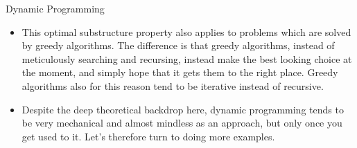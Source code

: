 \documentclass{beamer}
\begin{document}
\begin{frame}{Dynamic Programming}
    \begin{itemize}
        \item This optimal substructure property also applies to problems which are solved by greedy algorithms. The difference is that greedy algorithms, instead of meticulously searching and recursing, instead make the best looking choice at the moment, and simply hope that it gets them to the right place. Greedy algorithms also for this reason tend to be iterative instead of recursive. 
        \item Despite the deep theoretical backdrop here, dynamic programming tends to be very mechanical and almost mindless as an approach, but only once you get used to it. Let's therefore turn to doing more examples. 
    \end{itemize}
\end{frame}
\end{document}
